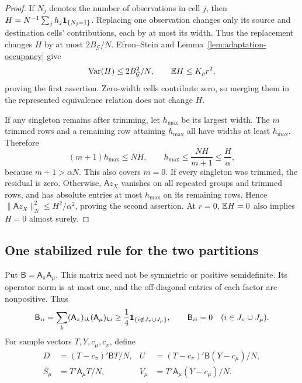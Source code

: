 \begin{proof}
If $N_j$ denotes the number of observations in cell $j$, then
$H=N^{-1}\sum_jh_j\mathbf 1_{\{N_j=1\}}$. Replacing one observation changes
only its source and destination cells' contributions, each by at most
its width. Thus the replacement changes $H$ by at most
$2B_{\mathcal G}/N$. Efron--Stein and
Lemma~\ref{lem:adaptation-occupancy} give
\[
 \operatorname{Var}(H)\le2B_{\mathcal G}^2/N,
 \qquad \mathbb E H\le K_\rho r^2,
\]
proving the first assertion. Zero-width cells contribute zero, so merging
them in the represented equivalence relation does not change $H$.

If any singleton remains after trimming, let $h_{\max}$ be its largest
width. The $m$ trimmed rows and a remaining row attaining $h_{\max}$ all
have widths at least $h_{\max}$. Therefore
\[
 (m+1)h_{\max}\le NH,\qquad
 h_{\max}\le\frac{NH}{m+1}\le\frac H\alpha,
\]
because $m+1>\alpha N$. This also covers $m=0$. If every singleton was
trimmed, the residual is zero. Otherwise, $\mathsf A z_X$ vanishes on
all repeated groups and trimmed rows, and has absolute entries at most
$h_{\max}$ on its remaining rows. Hence
$\|\mathsf A z_X\|_N^2\le H^2/\alpha^2$, proving the second assertion.
At $r=0$, $\mathbb E H=0$ also implies $H=0$ almost surely.
\end{proof}

\subsection{One stabilized rule for the two partitions}

Put $\mathsf B=\mathsf A_\pi\mathsf A_\mu$. This matrix need not be
symmetric or positive semidefinite. Its operator norm is at most one,
and the off-diagonal entries of each factor are nonpositive. Thus
\begin{equation}
 \mathsf B_{ii}
 =\sum_k(\mathsf A_\pi)_{ik}(\mathsf A_\mu)_{ki}
 \ge\frac14\mathbf 1_{\{i\notin J_\pi\cup J_\mu\}},
 \qquad
 \mathsf B_{ii}=0\quad(i\in J_\pi\cup J_\mu).
 \label{eq:adaptation-product-matrix}
\end{equation}
For sample vectors $T,Y,c_\mu,c_\pi$, define
\begin{align}
 D&=(T-c_\pi)'\mathsf B T/N,&
 U&=(T-c_\pi)'\mathsf B(Y-c_\mu)/N,\nonumber\\
 S_\mu&=T'\mathsf A_\mu T/N,&
 V_\mu&=T'\mathsf A_\mu(Y-c_\mu)/N.
 \label{eq:adaptation-affine-moments}
\end{align}

